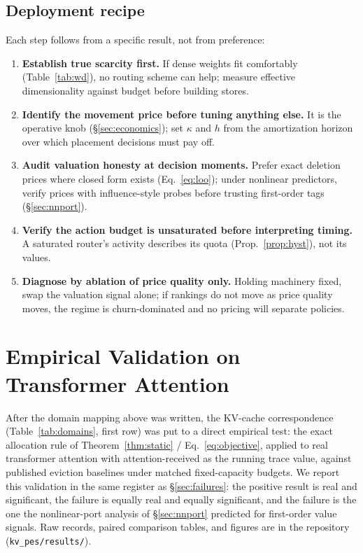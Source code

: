 \documentclass[10pt,twocolumn]{article}
\theoremstyle{definition}
\begin{document}
\subsection{Deployment recipe}\label{sec:recipe}
Each step follows from a specific result, not from preference:
\begin{enumerate}\setlength{\itemsep}{1pt}
\item \textbf{Establish true scarcity first.} If dense weights fit comfortably (Table~\ref{tab:wd}), no
routing scheme can help; measure effective dimensionality against budget before building stores.
\item \textbf{Identify the movement price before tuning anything else.} It is the operative knob
(\S\ref{sec:economics}); set $\kappa$ and $h$ from the amortization horizon over which placement decisions
must pay off.
\item \textbf{Audit valuation honesty at decision moments.} Prefer exact deletion prices where closed form
exists (Eq.~\eqref{eq:loo}); under nonlinear predictors, verify prices with influence-style probes before
trusting first-order tags (\S\ref{sec:nnport}).
\item \textbf{Verify the action budget is unsaturated before interpreting timing.} A saturated router's
activity describes its quota (Prop.~\ref{prop:hyst}), not its values.
\item \textbf{Diagnose by ablation of price quality only.} Holding machinery fixed, swap the valuation
signal alone; if rankings do not move as price quality moves, the regime is churn-dominated and no pricing
will separate policies.
\end{enumerate}

\section{Empirical Validation on Transformer Attention}\label{sec:kvval}
After the domain mapping above was written, the {KV}-cache correspondence (Table~\ref{tab:domains}, first
row) was put to a direct empirical test: the exact allocation rule of Theorem~\ref{thm:static} /
Eq.~\eqref{eq:objective}, applied to real transformer attention with attention-received as the running
trace value, against published eviction baselines under matched fixed-capacity budgets. We report this
validation in the same register as \S\ref{sec:failures}: the positive result is real and significant, the
failure is equally real and equally significant, and the failure is the one the nonlinear-port analysis of
\S\ref{sec:nnport} predicted for first-order value signals. Raw records, paired comparison tables, and
figures are in the repository (\texttt{kv\_pes/results/}).
\end{document}
